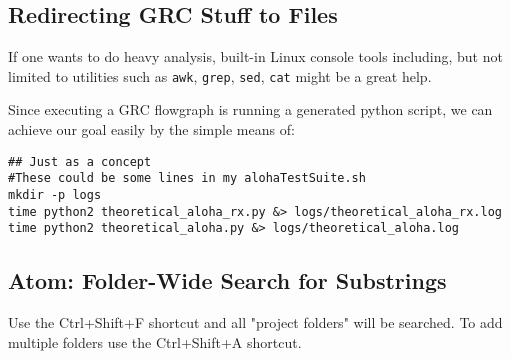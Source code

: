 \documentclass{article}
\begin{document}
\subsection{Redirecting GRC Stuff to Files}
If one wants to do heavy analysis, built-in Linux console tools including, but not limited to utilities such as \verb|awk|, \verb|grep|, \verb|sed|, \verb|cat| might be a great help.

Since executing a GRC flowgraph is running a generated python script, we can achieve our goal easily by the simple means of:

\begin{verbatim}
## Just as a concept
#These could be some lines in my alohaTestSuite.sh
mkdir -p logs
time python2 theoretical_aloha_rx.py &> logs/theoretical_aloha_rx.log
time python2 theoretical_aloha.py &> logs/theoretical_aloha.log
\end{verbatim}

\subsection{Atom: Folder-Wide Search for Substrings}
Use the Ctrl+Shift+F shortcut and all "project folders" will be searched. To add multiple folders use the Ctrl+Shift+A shortcut.
\end{document}
